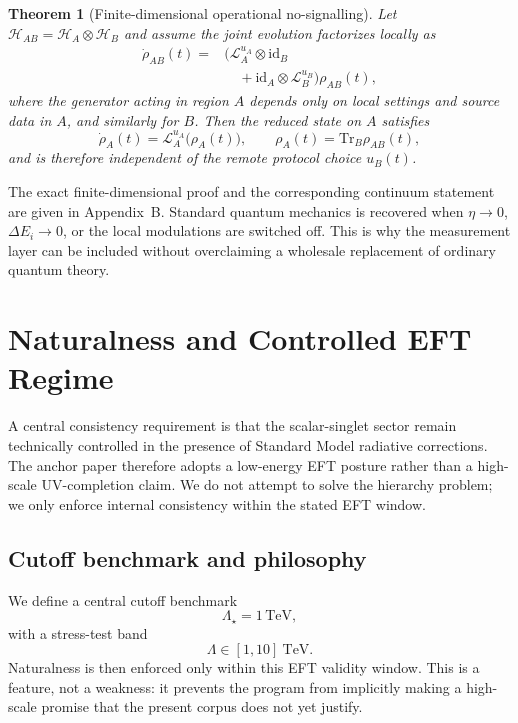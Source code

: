 \documentclass[aps,prd,twocolumn,superscriptaddress,nofootinbib]{revtex4-2}
\newtheorem{theorem}{Theorem}
\begin{document}
\begin{theorem}[Finite-dimensional operational no-signalling]
Let $\mathcal{H}_{AB}=\mathcal{H}_A\otimes\mathcal{H}_B$ and assume the joint evolution factorizes locally as
\begin{equation}
\begin{split}
\dot\rho_{AB}(t)={}&\bigl(\mathcal{L}^{u_A}_A\otimes \mathrm{id}_B \\
&\quad + \mathrm{id}_A\otimes \mathcal{L}^{u_B}_B\bigr)\rho_{AB}(t),
\end{split}
\label{eq:factorizedgksl}
\end{equation}
where the generator acting in region $A$ depends only on local settings and source data in $A$, and similarly for $B$. Then the reduced state on $A$ satisfies
\begin{equation}
\dot\rho_A(t)=\mathcal{L}^{u_A}_A\bigl(\rho_A(t)\bigr),\qquad \rho_A(t)=\mathrm{Tr}_B\rho_{AB}(t),
\end{equation}
and is therefore independent of the remote protocol choice $u_B(t)$.
\end{theorem}

The exact finite-dimensional proof and the corresponding continuum statement are given in Appendix~B. Standard quantum mechanics is recovered when $\eta\to 0$, $\Delta E_i\to 0$, or the local modulations are switched off. This is why the measurement layer can be included without overclaiming a wholesale replacement of ordinary quantum theory.

\section{Naturalness and Controlled EFT Regime}
A central consistency requirement is that the scalar-singlet sector remain technically controlled in the presence of Standard Model radiative corrections. The anchor paper therefore adopts a low-energy EFT posture rather than a high-scale UV-completion claim.
We do not attempt to solve the hierarchy problem; we only enforce internal consistency within the stated EFT window.

\subsection{Cutoff benchmark and philosophy}
We define a central cutoff benchmark
\begin{equation}
\Lambda_{\star}=1\,\mathrm{TeV},
\end{equation}
with a stress-test band
\begin{equation}
\Lambda\in[1,10]~\mathrm{TeV}.
\end{equation}
Naturalness is then enforced only within this EFT validity window. This is a feature, not a weakness: it prevents the program from implicitly making a high-scale promise that the present corpus does not yet justify.
\end{document}
